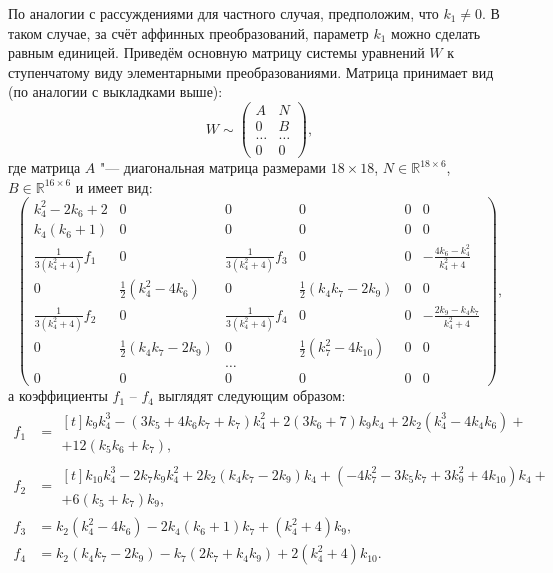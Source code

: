 \documentclass[../main.tex]{subfiles}
\begin{document}
По аналогии с рассуждениями для частного случая, предположим, что $k_1 \ne 0 $. В таком случае, за счёт аффинных преобразований, параметр $k_1$ можно сделать равным единицей. Приведём основную матрицу системы уравнений $W$ к ступенчатому виду элементарными преобразованиями. Матрица принимает вид (по аналогии с выкладками выше): 
\begin{equation*}
W \sim
\begin{pmatrix}
A & N \\
0 & B \\
\hdots & \hdots  \\
0 & 0
\end{pmatrix},
\end{equation*}
где матрица $A$ "--- диагональная матрица размерами $18\times18$, $N\in \mathbb{R}^{18\times6}$, $B \in \mathbb{R}^{16\times6}$ и имеет вид:
\begin{equation}\label{eq:matrix_general}
{\left(
\begin{array}{cccccc}
 k_4^2-2 k_6+2 & 0 & 0 & 0 & 0 & 0 \\
 k_4 \left(k_6+1\right) & 0 & 0 & 0 & 0 & 0 \\
 \frac{1}{3\left(k_4^2+4\right)}f_1 & 0 & \frac{1}{3 \left(k_4^2+4\right)}f_3 & 0 & 0 & -\frac{4
   k_6-k_4^2}{k_4^2+4} \\
 0 & \frac{1}{2} \left(k_4^2-4 k_6\right) & 0 & \frac{1}{2} \left(k_4 k_7-2 k_9\right) & 0 & 0 \\
 \frac{1}{3\left(k_4^2+4\right)}f_2 & 0 & \frac{1}{3 \left(k_4^2+4\right)}f_4 & 0 & 0 & -\frac{2k_9-k_4 k_7}{k_4^2+4} \\
 0 & \frac{1}{2} \left(k_4 k_7-2 k_9\right) & 0 & \frac{1}{2} \left(k_7^2-4 k_{10}\right) & 0 & 0 \\
  &  & \hdots &  &  & \\
 0 & 0 & 0 & 0 & 0 & 0
\end{array}
\right)},
\end{equation}
а коэффициенты $f_1$ -- $f_4$ выглядят следующим образом:
\begin{align*}
f_1 &=
\begin{multlined}[t]
k_9 k_4^3-\left(3 k_5+4 k_6 k_7+k_7\right) k_4^2+2 \left(3 k_6+7\right) k_9 k_4+2 k_2 \left(k_4^3-4 k_4 k_6\right) + \\ 
+ 12 \left(k_5 k_6+k_7\right),
\end{multlined}\\
f_2 &= 
\begin{multlined}[t]
k_{10} k_4^3-2 k_7 k_9 k_4^2+2 k_2 \left(k_4 k_7-2 k_9\right) k_4+\left(-4 k_7^2-3 k_5 k_7+3 k_9^2+4 k_{10}\right) k_4+ \\
+ 6 \left(k_5+k_7\right) k_9,
\end{multlined}\\
f_3 &= k_2 \left(k_4^2-4 k_6\right)-2 k_4 \left(k_6+1\right) k_7+\left(k_4^2+4\right) k_9, \\ 
f_4 &= k_2 \left(k_4 k_7-2 k_9\right)-k_7 \left(2 k_7+k_4 k_9\right)+2 \left(k_4^2+4\right) k_{10}.
\end{align*}
\end{document}
